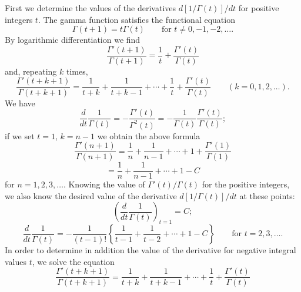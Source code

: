 First we determine the values of the derivatives $d[1/\Gamma(t)]/dt$ for positive integers $t$. The gamma function satisfies the functional equation
\[
\Gamma(t+1)=t\Gamma(t)\qquad\text{for }t\ne0,-1,-2,\ldots.
\]
By logarithmic differentiation we find
\[
\frac{\Gamma'(t+1)}{\Gamma(t+1)}=\frac1t+\frac{\Gamma'(t)}{\Gamma(t)}
\]
and, repeating $k$ times,
\[
\frac{\Gamma'(t+k+1)}{\Gamma(t+k+1)}
=\frac1{t+k}+\frac1{t+k-1}+\cdots+\frac1t+\frac{\Gamma'(t)}{\Gamma(t)}
\qquad(k=0,1,2,\ldots).
\]
We have
\[
\frac d{dt}\frac1{\Gamma(t)}=-\frac{\Gamma'(t)}{\Gamma^2(t)}
=-\frac1{\Gamma(t)}\frac{\Gamma'(t)}{\Gamma(t)};
\]
if we set $t=1$, $k=n-1$ we obtain the above formula
\[
\frac{\Gamma'(n+1)}{\Gamma(n+1)}
=\frac1n+\frac1{n-1}+\cdots+1+\frac{\Gamma'(1)}{\Gamma(1)}
\]
\[
=\frac1n+\frac1{n-1}+\cdots+1-C
\]
for $n=1,2,3,\ldots$. Knowing the value of $\Gamma'(t)/\Gamma(t)$ for the positive integers, we also know the desired value of the derivative $d[1/\Gamma(t)]/dt$ at these points:
\[
\left(\frac d{dt}\frac1{\Gamma(t)}\right)_{t=1}=C;
\]
\[
\frac d{dt}\frac1{\Gamma(t)}
=-\frac1{(t-1)!}\left\{\frac1{t-1}+\frac1{t-2}+\cdots+1-C\right\}
\qquad\text{for }t=2,3,\ldots.
\]
In order to determine in addition the value of the derivative for negative integral values $t$, we solve the equation
\[
\frac{\Gamma'(t+k+1)}{\Gamma(t+k+1)}
=\frac1{t+k}+\frac1{t+k-1}+\cdots+\frac1t+\frac{\Gamma'(t)}{\Gamma(t)}
\]

